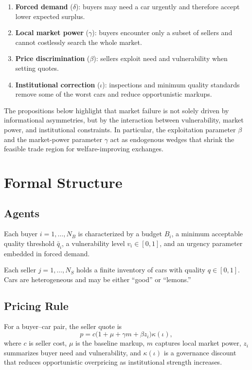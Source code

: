 \documentclass[12pt]{article}
\begin{document}
\begin{enumerate}
    \item \textbf{Forced demand} ($\delta$): buyers may need a car urgently and therefore accept lower expected surplus.
    \item \textbf{Local market power} ($\gamma$): buyers encounter only a subset of sellers and cannot costlessly search the whole market.
    \item \textbf{Price discrimination} ($\beta$): sellers exploit need and vulnerability when setting quotes.
    \item \textbf{Institutional correction} ($\iota$): inspections and minimum quality standards remove some of the worst cars and reduce opportunistic markups.
\end{enumerate}

The propositions below highlight that market failure is not solely driven by informational asymmetries, but by the interaction between vulnerability, market power, and institutional constraints. In particular, the exploitation parameter $\beta$ and the market-power parameter $\gamma$ act as endogenous wedges that shrink the feasible trade region for welfare-improving exchanges.

\section{Formal Structure}

\subsection{Agents}

Each buyer $i=1,\dots,N_B$ is characterized by a budget $B_i$, a minimum acceptable quality threshold $\bar q_i$, a vulnerability level $v_i \in [0,1]$, and an urgency parameter embedded in forced demand.

Each seller $j=1,\dots,N_S$ holds a finite inventory of cars with quality $q \in [0,1]$. Cars are heterogeneous and may be either ``good'' or ``lemons.''

\subsection{Pricing Rule}

For a buyer--car pair, the seller quote is
\[
p = c \bigl(1 + \mu + \gamma m + \beta z_i \bigr)\kappa(\iota),
\]
where $c$ is seller cost, $\mu$ is the baseline markup, $m$ captures local market power, $z_i$ summarizes buyer need and vulnerability, and $\kappa(\iota)$ is a governance discount that reduces opportunistic overpricing as institutional strength increases.
\end{document}
